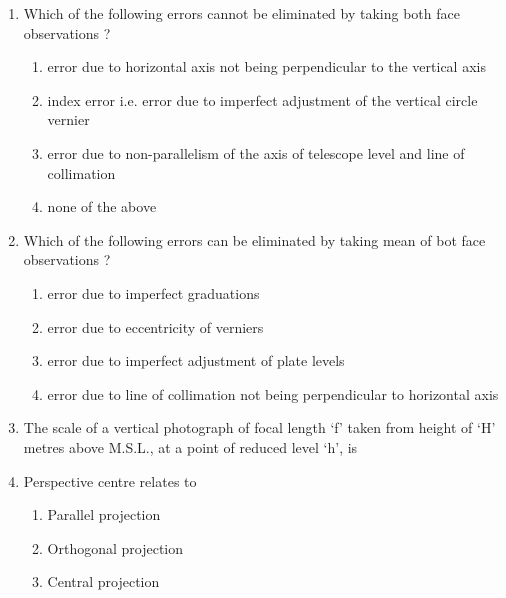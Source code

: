 \documentclass[11pt,a4paper]{article}
\begin{document}
\begin{enumerate}
\item{Which of the following errors cannot be eliminated by taking both face observations ?}
\begin{enumerate}[label=\Alph*.]
\item{error due to horizontal axis not being perpendicular to the vertical axis}
\item{index error i.e. error due to imperfect adjustment of the vertical circle vernier}
\item{error due to non-parallelism of the axis of telescope level and line of collimation}
\item{none of the above}
\end{enumerate}
\item{Which of the following errors can be eliminated by taking mean of bot face observations ?}
\begin{enumerate}[label=\Alph*.]
\item{error due to imperfect graduations}
\item{error due to eccentricity of verniers}
\item{error due to imperfect adjustment of plate levels}
\item{error due to line of collimation not being perpendicular to horizontal axis}
\end{enumerate}
\item{The scale of a vertical photograph of focal length `f' taken from height of `H' metres above M.S.L., at a point of reduced level `h', is
}
\\
\item{Perspective centre relates to}
\begin{enumerate}[label=\Alph*.]
\item{Parallel projection}
\item{Orthogonal projection}
\item{Central projection}

\end{enumerate}
\end{enumerate}
\end{document}
